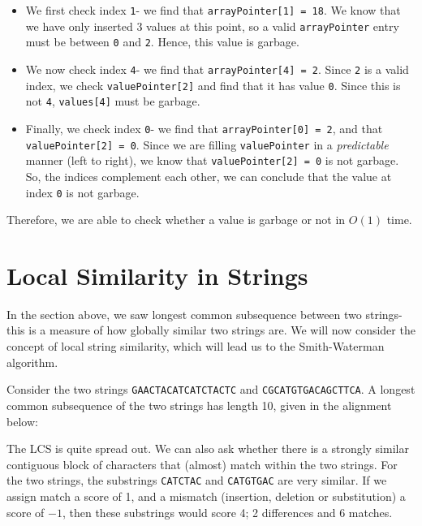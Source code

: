 \documentclass[a4paper, openany]{memoir}
\begin{document}
    \begin{itemize}
        \item We first check index \texttt{1}- we find that \texttt{arrayPointer[1] = 18}. We know that we have only inserted 3 values at this point, so a valid \texttt{arrayPointer} entry must be between \texttt{0} and \texttt{2}. Hence, this value is garbage.
        \item We now check index \texttt{4}- we find that \texttt{arrayPointer[4] = 2}. Since \texttt{2} is a valid index, we check \texttt{valuePointer[2]} and find that it has value \texttt{0}. Since this is not \texttt{4}, \texttt{values[4]} must be garbage.
        \item Finally, we check index \texttt{0}- we find that \texttt{arrayPointer[0] = 2}, and that \texttt{valuePointer[2] = 0}. Since we are filling \texttt{valuePointer} in a \emph{predictable} manner (left to right), we know that \texttt{valuePointer[2] = 0} is not garbage. So, the indices complement each other, we can conclude that the value at index \texttt{0} is not garbage.
    \end{itemize}
    Therefore, we are able to check whether a value is garbage or not in $O(1)$ time.
    
    \newpage

    \section{Local Similarity in Strings}
    In the section above, we saw longest common subsequence between two strings- this is a measure of how globally similar two strings are. We will now consider the concept of local string similarity, which will lead us to the Smith-Waterman algorithm.

    Consider the two strings \texttt{GAACTACATCATCTACTC} and \texttt{CGCATGTGACAGCTTCA}. A longest common subsequence of the two strings has length 10, given in the alignment below:
    \begin{table}[H]
        \centering
    \end{table}
    \noindent The LCS is quite spread out. We can also ask whether there is a strongly similar contiguous block of characters that (almost) match within the two strings. For the two strings, the substrings \texttt{CATCTAC} and \texttt{CATGTGAC} are very similar. If we assign match a score of 1, and a mismatch (insertion, deletion or substitution) a score of $-1$, then these substrings would score 4; 2 differences and 6 matches.
\end{document}
